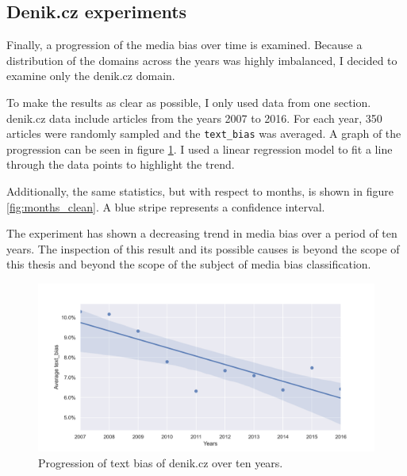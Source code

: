


\subsection{Denik.cz experiments}
Finally, a progression of the media bias over time is examined. Because a distribution of the domains across the years was highly imbalanced, I decided to examine only the denik.cz domain.

To make the results as clear as possible, I only used data from one section. denik.cz data include articles from the years 2007 to 2016. For each year, 350 articles were randomly sampled and the \verb|text_bias| was averaged. A graph of the progression can be seen in figure \ref{fig:denik_years}. I used a linear regression model to fit a line through the data points to highlight the trend.

Additionally, the same statistics, but with respect to months, is shown in figure \ref{fig:months_clean}. A blue stripe represents a confidence interval.

The experiment has shown a decreasing trend in media bias over a period of ten years. The inspection of this result and its possible causes is beyond the scope of this thesis and beyond the scope of the subject of media bias classification. 


\begin{figure}[h]

  \includegraphics[scale=0.5]{my_modules/multimedia/inference/denik_years.png}
  \caption{Progression of text bias of denik.cz over ten years.}
  \label{fig:denik_years}

\end{figure}


